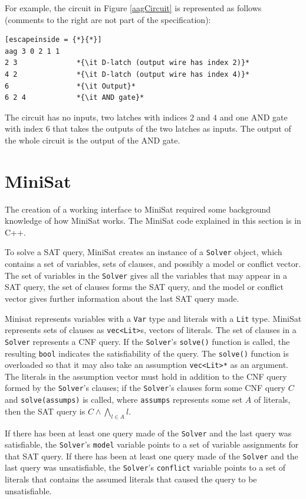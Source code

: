 \documentclass[12pt,a4paper,twoside,openright]{report}
\begin{document}
{{{For example, the circuit in Figure \ref{aagCircuit} is represented
as follows (comments to the right are not part of the specification):
\begin{lstlisting}[escapeinside = {*}{*}]
aag 3 0 2 1 1
2 3              *{\it D-latch (output wire has index 2)}*
4 2              *{\it D-latch (output wire has index 4)}*
6                *{\it Output}*
6 2 4            *{\it AND gate}*
\end{lstlisting}
The circuit has no inputs, two latches with indices $2$ and $4$ and one AND gate
with index $6$ that takes the outputs of the two latches as inputs.
The output of the whole circuit is the output of the AND gate.
}


\section{MiniSat}
\label{prep:minisat}

The creation of a
working interface to MiniSat required some background knowledge of how MiniSat
works. The MiniSat code explained in this section is in C++.

To solve a SAT query, MiniSat creates an instance of a \verb,Solver, object,
which contains a set of variables, sets of clauses, and possibly a model or conflict vector.
The set of variables in the \verb,Solver, gives all the variables that may appear in
a SAT query, the set of clauses forms the SAT query, and the model or conflict vector
gives further information about the last SAT query made.

Minisat represents variables with a \verb,Var, type and
literals with a \verb,Lit, type.
MiniSat represents sets of clauses as \verb,vec<Lit>,s,
vectors of literals. The set of clauses in a \verb,Solver, represents a CNF query.
If the \verb,Solver,'s \verb,solve(), function is called,
the resulting \verb,bool, indicates the satisfiability of the query. The
\verb,solve(), function is overloaded so that it may also take an assumption \verb,vec<Lit>*, as
an argument. The literals in the assumption vector must hold in addition to the CNF query formed
by the \verb,Solver,'s clauses; if the \verb,Solver,'s clauses form some CNF query $C$ and
\verb,solve(assumps), is called, where \verb,assumps, represents some set $A$ of literals,
then the SAT query is $C \wedge \bigwedge_{l \in A} l$.

If there has been at least one query made of the \verb,Solver, and the last query was
satisfiable, the \verb,Solver,'s \verb,model, variable points to a set of variable assignments
for that SAT query.
If there has been at least one query made of the \verb,Solver, and the last query was
unsatisfiable, the \verb,Solver,'s \verb,conflict, variable points to a set of literals that
contains the assumed literals that caused the query to be unsatisfiable.

}}
\end{document}
